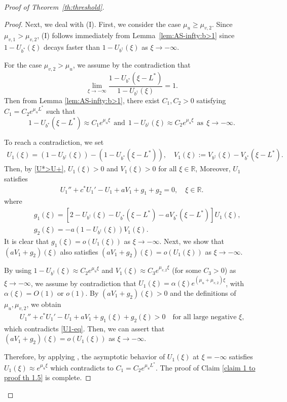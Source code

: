 \documentclass[11pt,a4paper]{article}
\numberwithin{equation}{section}
\numberwithin{figure}{section}
\newcommand\bea{\begin{eqnarray}}
\newcommand\eea{\end{eqnarray}}
\newcommand\beaa{\begin{eqnarray*}}
\newcommand\eeaa{\end{eqnarray*}}
\begin{document}
\begin{proof}[Proof of Theorem~\ref{th:threshold}]
\begin{proof}
Next, we deal with (I).
First, we consider the case $\mu_u\ge \mu_{v,2}$. Since $\mu_{v,1}>\mu_{v,2}$,
(I) follows immediately from Lemma~\ref{lem:AS-infty:b>1} since $1-U_{b^*}(\xi)$ decays faster than
$1-U_{b^\dag}(\xi)$ as $\xi\to-\infty$.

For the case $\mu_{v,2}>\mu_u$,
we assume by the  contradiction that
$$\lim_{\xi\to-\infty}\frac{1-U_{b^*}(\xi-L^*)}{1-U_{b^\dag}(\xi)}=1.$$
Then from Lemma \ref{lem:AS-infty:b>1}, there exist $C_1,C_2>0$ satisfying $C_1=C_2e^{\mu_u L^*}$ such that 
$$1-U_{b^*}(\xi-L^*)\approx C_1e^{\mu_u\xi}\ \ \text{and}\ \ 1-U_{b^\dag}(\xi)\approx C_2e^{\mu_u\xi}\ \ \text{as}\ \ \xi\to-\infty.$$

To reach a contradiction,
we set
\beaa
U_1(\xi)=(1-U_{b^\dag}(\xi))-(1-U_{b^*}(\xi-L^*)), \quad V_1(\xi):= V_{b^\dag}(\xi)-V_{b^*}(\xi-L^*).
\eeaa
Then, by \eqref{U*>U+},
$U_1(\xi)>0$ and $V_1(\xi)>0$ for all $\xi\in\mathbb{R}$, Moreover, $U_1$ satisfies
\bea\label{U1-eq}
U_1''+c^* U_1'-U_1+aV_1+g_1+g_2=0,\quad \xi\in\mathbb{R}.
\eea
where
\beaa
&&g_1(\xi)=[2-U_{b^\dag}(\xi)-U_{b^*}(\xi-L^*)-aV_{b^*}(\xi-L^*)]U_1(\xi),\\
&&g_2(\xi)=-a(1-U_{b^\dag}(\xi))V_1(\xi).
\eeaa
It is clear that $g_1(\xi)=o(U_1(\xi))$ as $\xi\to-\infty$. Next, we show that $(aV_1+g_2)(\xi)$ also satisfies $(aV_1+g_2)(\xi)=o(U_1(\xi))$ as $\xi\to-\infty$.

By using 
$1-U_{b^\dag}(\xi)\approx C_2e^{\mu_u\xi}$ and $V_1(\xi)\approx C_3e^{\mu_{v,2}\xi}$ (for some $C_3>0$) as $\xi\to-\infty$,
we assume by contradiction that $U_1(\xi)=\alpha(\xi)e^{(\mu_u+\mu_{v,2})\xi}$, with $\alpha(\xi)=O(1)$ or $o(1)$. By $(aV_1+g_2)(\xi)>0$ and the definitions of $\mu_u,\mu_{v,2}$, we obtain
\beaa
U_1''+c^* U_1'-U_1+aV_1+g_1(\xi)+g_2(\xi)>0\quad \mbox{for all large negative $\xi$,}
\eeaa
which contradicts \eqref{U1-eq}. Then, we can assert that $(aV_1+g_2)(\xi)=o(U_1(\xi))$ as $\xi\to-\infty$.

Therefore, by applying \cite[Chapter 3, Theorem 8.1]{CoddingtonLevison}, the asymptotic behavior of $U_1(\xi)$ at $\xi=-\infty$ satisfies $U_1(\xi)\approx e^{\mu_u \xi}$ which contradicts to $C_1=C_2e^{\mu_u L^*}$. The proof of Claim \ref{claim 1 to proof th 1.5} is complete.
\end{proof}



\end{proof}
\end{document}
